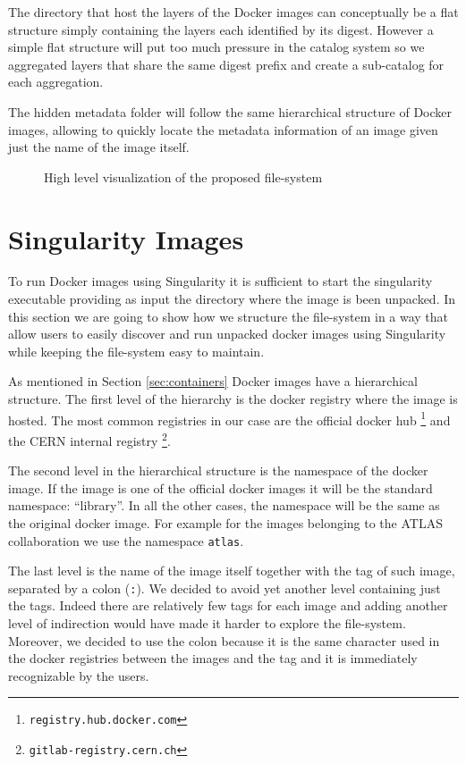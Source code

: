 The directory that host the layers of the Docker images can conceptually be a
flat structure simply containing the layers each identified by its digest.
However a simple flat structure will put too much pressure in the catalog
system so we aggregated layers that share the same digest prefix and create
a sub-catalog for each aggregation.

The hidden metadata folder will follow the same hierarchical structure of
Docker images, allowing to quickly locate the metadata information of an image
given just the name of the image itself.

\begin{figure}
\caption{High level visualization of the proposed file-system}
\label{fig:high-level-fs}
\end{figure}


\section{Singularity Images}
\label{sec:methodology-singularity}

To run Docker images using Singularity it is sufficient to start the singularity
executable providing as input the directory where the image is been unpacked.
In this section we are going to show how we structure the file-system in a way
that allow users to easily discover and run unpacked docker images using
Singularity while keeping the file-system easy to maintain.

As mentioned in Section \ref{sec:containers} Docker images have
a hierarchical structure.  The first level of the hierarchy is the docker
registry where the image is hosted.  The most common registries in our case are
the official docker hub \footnote{\texttt{registry.hub.docker.com}} and the
CERN internal registry \footnote{\texttt{gitlab-registry.cern.ch}}.

The second level in the hierarchical structure is the namespace of the docker
image.  If the image is one of the official docker images it will be the
standard namespace: “library”.  In all the other cases, the namespace will be
the same as the original docker image.  For example for the images belonging to
the ATLAS collaboration we use the namespace \texttt{atlas}.

The last level is the name of the image itself together with the tag of such
image, separated by a colon (\texttt{:}).  We decided to avoid yet another
level containing just the tags.  Indeed there are relatively few tags for each
image and adding another level of indirection would have made it harder to
explore the file-system.  Moreover, we decided to use the colon because it is
the same character used in the docker registries between the images and the tag
and it is immediately recognizable by the users.

